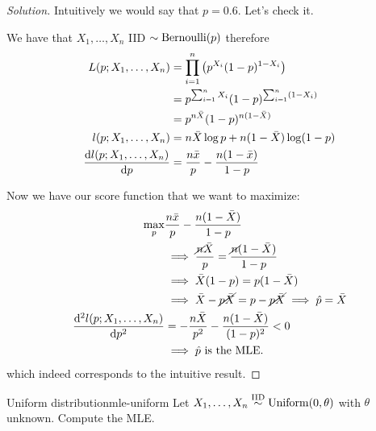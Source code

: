 \documentclass[12pt]{extarticle}
\newcommand{\Bernoulli}{{\operatorfont Bernoulli}}
\newcommand{\Uniform}{{\operatorfont Uniform}}
\begin{document}
\begin{proof}[Solution]
    Intuitively we would say that $p = 0.6$.
    Let's check it.

    We have that $X_1, \dots, X_n$ IID $\sim \Bernoulli(p)$ therefore
    \begin{align}
        L(p; X_1, \dots, X_n)         & = \prod_{i = 1}^n \left( p^{X_i} (1 - p)^{1-X_i} \right)   \\
                                      & = p ^{\sum_{i = 1}^n X_i} (1-p) ^{\sum_{i = 1}^n (1- X_i)} \\
                                      & = p^{n \bar X} (1-p)^{n(1-\bar{X})}                        \\
        l(p; X_1, \dots, X_n)         & = n \bar X \log p + n(1- \bar{X}) \log(1-p)                \\
        \dv{l(p; X_1, \dots, X_n)}{p} & = \frac{n \bar x}{p} - \frac{n(1-\bar{x})}{1-p}
    \end{align}

    Now we have our score function that we want to maximize:
    \begin{align}
        \max_p                           & \frac{n \bar x}{p} - \frac{n(1-\bar{X})}{1-p}                             \\
                                         & \implies \frac{\cancel {n} \bar X}{p} = \frac{\cancel{n}(1-\bar{X})}{1-p} \\
                                         & \implies \bar{X} (1-p) = p (1-\bar X)                                     \\
                                         & \implies \bar{X} -\cancel{p\bar{X}} = p -\cancel{p\bar{X}}
        \implies \hat p = \bar{X}                                                                                    \\
        \dv[2]{l(p; X_1, \dots, X_n)}{p} & = -\frac{n \bar{X}}{p^2} - \frac{n(1-\bar X)}{(1-p)^2} < 0                \\
                                         & \implies \hat p \text{ is the MLE.}
    \end{align}
    which indeed corresponds to the intuitive result.
\end{proof}

\begin{example}{Uniform distribution}{mle-uniform}
    Let $X_1, \dots, X_n \stackrel{\text{IID}}{\sim} \Uniform(0,\theta)$ with $\theta$ unknown.
    Compute the MLE.
\end{example}
\end{document}
